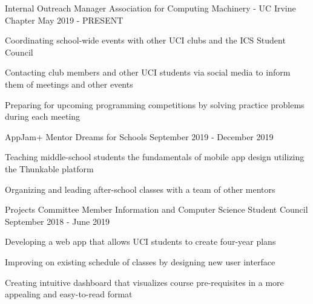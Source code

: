 
\begin{cventries}
	\cventry
	{Internal Outreach Manager} %
	{Association for Computing Machinery - UC Irvine Chapter} %
	{} %
	{May 2019 - PRESENT} %
	{
		\begin{cvitems}
			\item {Coordinating school-wide events with other UCI clubs and the ICS Student Council}
			\item {Contacting club members and other UCI students via social media to inform them of meetings and other events}
			\item {Preparing for upcoming programming competitions by solving practice problems during each meeting}
		\end{cvitems}
	}

	\cventry
	{AppJam+ Mentor}
	{Dreams for Schools}
	{}
	{September 2019 - December 2019}
	{
	\begin{cvitems}
		\item{Teaching middle-school students the fundamentals of mobile app design utilizing the Thunkable platform}
		\item{Organizing and leading after-school classes with a team of other mentors}
	\end{cvitems}
	}
  

  	\cventry
    {Projects Committee Member} %
    {Information and Computer Science Student Council} %
    {} %
    {September 2018 - June 2019} %
    {
      \begin{cvitems} %
        \item {Developing a web app that allows UCI students to create four-year plans}
        \item {Improving on existing schedule of classes by designing new user interface}
        \item {Creating intuitive dashboard that visualizes course pre-requisites in a more appealing and easy-to-read format}
      \end{cvitems}
    }
    
  
    
\end{cventries}
